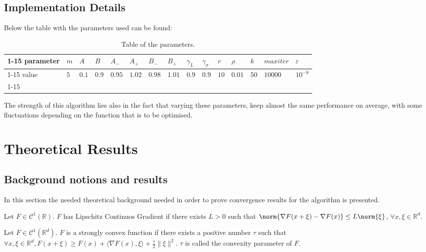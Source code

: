 \subsection{Implementation Details}

Below the table with the parameters used can be found:

\begin{table}[!ht]
\hspace{-13mm}
\begin{tabular}{|l|llllllllllllll|}
\cline{1-15}
 parameter & $m$ & $A$   & $B$   & $A_-$ & $A_+$ & $B_-$ & $B_+$ & $\gamma_L$ & $\gamma_\sigma$ & $r$  & $\rho$ & $k$ & $maxiter$ & $\varepsilon$\\ \cline{1-15}
 value & $5$ & $0.1$ & $0.9$ & $0.95$ & $1.02$ & $0.98$ & $1.01$ & $0.9$ & $0.9$ & $10$ & $0.01$ & $50$ & $10000$ & $10^{-8}$            \\ \cline{1-15}
\end{tabular}
\caption[Table of the parameters.]{Table of the parameters.}
\end{table}

The strength of this algorithm lies also in the fact that varying these parameters, keep almost the same performance on average, with some fluctuations depending on the function that is to be optimised.

\section{Theoretical Results}

\subsection{Background notions and results}

In this section the needed theoretical background needed in order to prove convergence results for the algorithm is presented.

\begin{defn}\label{LipschitzContinousGradient}
Let $F\in\mathcal{C}^1 (\mathbb{R})$. $F$ has Lipschitz Continuos Gradient if there exists $L>0$ such that $\norm{\nabla F(x+\xi) - \nabla F(x)} \leq L \norm{\xi}$, $\forall x, \xi \in \mathbb{R}^d$.
\end{defn}

\begin{defn}
Let $F\in\mathcal{C}^1 (\mathbb{R}^d)$. $F$ is a strongly convex function if there exists a positive number $\tau$ such that $\forall x, \xi \in \mathbb{R}^{d}, F(x+\xi) \geq F(x)+\langle\nabla F(x), \xi\rangle+\frac{\tau}{2}\|\xi\|^{2}$. $\tau$ is called the convexity parameter of $F$.
\end{defn}

